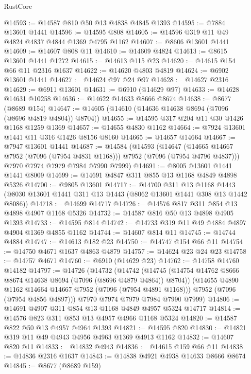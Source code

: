 \begin{lexlean}{RustCore}
\begin{coremodule}
@14593 := @14587 @810 @50 @13 @4838 @4845 @1393
@14595 := @7884 @13601 @1441
@14596 := @14595 @808
@14605 := @14596 @319 @11 @49 @4824 @4837 @4844 @1369 @4795 @1162
@14607 := @8606 @13601 @1441
@14609 := @14607 @808 @11
@14610 := @14609 @4824
@14613 := @8615 @13601 @1441 @1272
@14615 := @14613 @115 @23
@14620 := @14615 @154 @66 @11 @2316 @1637
@14622 := @14620 @4803 @4819
@14624 := @6902 @13601 @1441
@14627 := @14624 @97 @24 @97
@14628 := @14627 @2316
@14629 := @6911 @13601
@14631 := @6910 (@14629 @97)
@14633 := @14628 @14631 @10258
@14636 := @14622 @14633 @8666 @8674
@14638 := @8677 (@8689 @154)
@14647 := @14605 (@14610 (@14636 @14638 @8694 (@7096 (@8696 @4819 @4804)) @8704))
@14655 := @14595 @317 @204 @11 @30 @1426 @1168 @1259 @1369
@14657 := @14655 @4830 @1162
@14664 := @7924 @13601 @1441 @11 @316 @1426 @8156 @8160
@14665 := @14657 @14664
@14667 := @7947 @13601 @1441
@14687 := @14584
    (@14593
      (@14647 (@14665 @14667 @7952 (@7096 (@7954 @4831 @1168))) @7952 (@7096 (@7954 @4796 @4837)))
      @7970
      @7974
      @7979
      @7984
      @7990
      @7999)
@14691 := @8005 @13601 @1441 @1441 @8009
@14699 := @14691 @4847 @311 @855 @13 @1168 @4849 @4898 @5326
@14700 := @9805 @13601
@14717 := @14700
    @311
    @13
    @1168
    @1443
    (@8030 @13601 @1441 @311 @13 @1443 (@8062 @13601 @1441 @308 @13 @1442 @8086))
@14718 := @14699 @14717
@14726 := @14576 @817 @311 @854 @13 @4898 @4907 @1168 @5326
@14732 := @14587 @816 @50 @13 @4898 @4905 @1393
@14733 := @14595 @814
@14742 := @14733 @319 @11 @49 @4884 @4897 @4904 @1369 @4855 @1162
@14744 := @14607 @814 @11
@14745 := @14744 @4884
@14747 := @14613 @182 @23
@14750 := @14747 @154 @66 @11
@14754 := @14750 @4671 @1637 @4863 @4879
@14757 := @14624 @23 @24 @23
@14758 := @14757 @4671
@14760 := @6910 (@14629 @23)
@14762 := @14758 @14760 @14182
@14797 := @14726
    (@14732
      (@14742
        (@14745 (@14754 @14762 @8666 @8674 @14638 @8694 (@7096 (@8696 @4879 @4864)) @8704))
        (@14655 @4890 @1162 @14664 @14667 @7952 (@7096 (@7954 @4891 @1168)))
        @7952
        (@7096 (@7954 @4856 @4897)))
      @7970
      @7974
      @7979
      @7984
      @7990
      @7999)
@14806 := @14691 @4907 @311 @854 @13 @1168 @4849 @4957 @5324 @14717
@14814 := @14576 @823 @311 @853 @13 @4957 @4966 @1168 @5324
@14820 := @14587 @822 @50 @13 @4957 @4964 @1393
@14821 := @14595 @820
@14830 := @14821 @319 @11 @49 @4943 @4956 @4963 @1369 @4913 @1162
@14832 := @14607 @820 @11
@14833 := @14832 @4943
@14836 := @14615 @159 @66 @11
@14838 := @14836 @2316 @1637
@14843 := @14838 @4921 @4938 @14633 @8666 @8674
@14845 := @8677 (@8689 @159)

\end{coremodule}
\end{lexlean}
